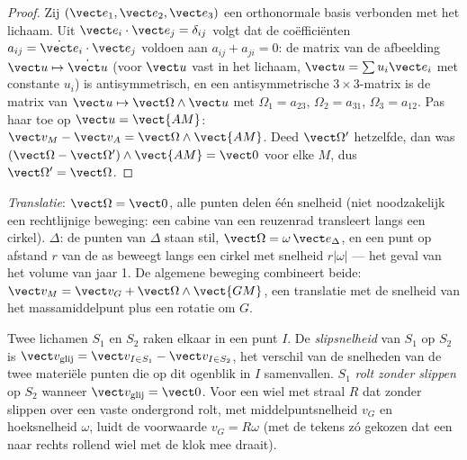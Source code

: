 \begin{proof}
Zij $(\vect e_1, \vect e_2, \vect e_3)$ een orthonormale basis verbonden met
het lichaam. Uit $\vect e_i\cdot\vect e_j = \delta_{ij}$ volgt dat de
coëfficiënten $a_{ij} = \dot{\vect e}_i\cdot\vect e_j$ voldoen aan
$a_{ij} + a_{ji} = 0$: de matrix van de afbeelding
$\vect u \mapsto \dot{\vect u}$ (voor
$\vect u$ vast in het lichaam, $\vect u = \sum u_i\vect e_i$ met
constante $u_i$) is antisymmetrisch, en een
antisymmetrische $3\times3$-matrix is de matrix van
$\vect u \mapsto \vect\Omega\wedge\vect u$ met $\Omega_1 = a_{23}$,
$\Omega_2 = a_{31}$,
$\Omega_3 = a_{12}$. Pas haar toe op $\vect u =
\vect{AM}$:
$\vect v_M - \vect v_A = \vect\Omega\wedge\vect{AM}$. Deed $\vect\Omega'$
hetzelfde,
dan was $(\vect\Omega - \vect\Omega')\wedge
\vect{AM} = \vect 0$ voor elke
$M$, dus $\vect\Omega' = \vect\Omega$.
\end{proof}

\begin{remark}\label{rem:b2:rigid-body-mechanics:motions}
\emph{Translatie}: $\vect\Omega = \vect 0$, alle punten delen één
snelheid (niet noodzakelijk een rechtlijnige beweging: een cabine van een
reuzenrad transleert langs een cirkel). \emph{}
$\Delta$: de punten van $\Delta$ staan stil,
$\vect\Omega = \omega\,\vect e_\Delta$, en een punt op afstand $r$ van de as
beweegt
langs een cirkel met snelheid $r|\omega|$ --- het geval van het volume van
jaar 1. De algemene beweging combineert beide:
$\vect v_M = \vect v_G + \vect\Omega\wedge\vect{GM}$, een translatie met de
snelheid van het
massamiddelpunt plus een rotatie om $G$.
\end{remark}

\begin{definition}\label{def:b2:rigid-body-mechanics:rolling}
Twee lichamen $S_1$ en $S_2$ raken elkaar in een punt $I$. De
\emph{slipsnelheid} van $S_1$ op $S_2$ is
$\vect v_{\text{glij}} = \vect v_{I \in S_1}
- \vect v_{I \in S_2}$, het
verschil van de snelheden van de twee
materiële punten die op dit ogenblik in $I$ samenvallen. $S_1$
\emph{rolt zonder slippen} op $S_2$ wanneer $\vect v_{\text{glij}} = \vect 0$.
Voor een wiel met straal $R$ dat zonder slippen over een vaste ondergrond
rolt, met middelpuntsnelheid $v_G$ en hoeksnelheid $\omega$, luidt de
voorwaarde $v_G = R\omega$ (met de tekens zó gekozen dat een naar rechts
rollend wiel met de klok mee draait).
\end{definition}


